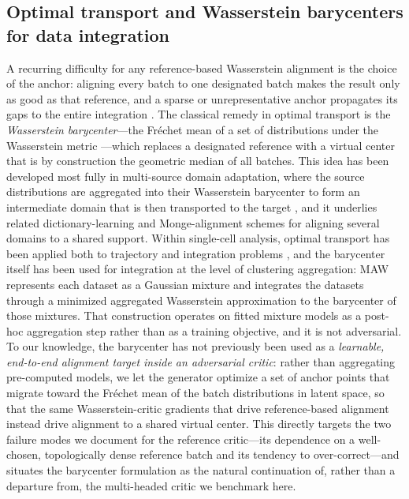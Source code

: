 \documentclass[unnumsec,webpdf,contemporary,large]{oup-authoring-template}%
\theoremstyle{thmstyleone}%
\theoremstyle{thmstyletwo}%
\theoremstyle{thmstylethree}%
\begin{document}
\subsection{Optimal transport and Wasserstein barycenters for data integration}
A recurring difficulty for any reference-based Wasserstein alignment is the choice of the anchor: aligning every batch to one designated batch makes the result only as good as that reference, and a sparse or unrepresentative anchor propagates its gaps to the entire integration \citep{ijms24065502}. The classical remedy in optimal transport is the \textit{Wasserstein barycenter}---the Fr\'echet mean of a set of distributions under the Wasserstein metric \citep{doi:10.1137/100805741}---which replaces a designated reference with a virtual center that is by construction the geometric median of all batches. This idea has been developed most fully in multi-source domain adaptation, where the source distributions are aggregated into their Wasserstein barycenter to form an intermediate domain that is then transported to the target \citep{Montesuma2021-wbt}, and it underlies related dictionary-learning and Monge-alignment schemes for aligning several domains to a shared support. Within single-cell analysis, optimal transport has been applied both to trajectory and integration problems \citep{Ma2022-otsc}, and the barycenter itself has been used for integration at the level of clustering aggregation: MAW \citep{Lin2023-maw} represents each dataset as a Gaussian mixture and integrates the datasets through a minimized aggregated Wasserstein approximation to the barycenter of those mixtures. That construction operates on fitted mixture models as a post-hoc aggregation step rather than as a training objective, and it is not adversarial. To our knowledge, the barycenter has not previously been used as a \textit{learnable, end-to-end alignment target inside an adversarial critic}: rather than aggregating pre-computed models, we let the generator optimize a set of anchor points that migrate toward the Fr\'echet mean of the batch distributions in latent space, so that the same Wasserstein-critic gradients that drive reference-based alignment instead drive alignment to a shared virtual center. This directly targets the two failure modes we document for the reference critic---its dependence on a well-chosen, topologically dense reference batch and its tendency to over-correct---and situates the barycenter formulation as the natural continuation of, rather than a departure from, the multi-headed critic we benchmark here.
\end{document}
